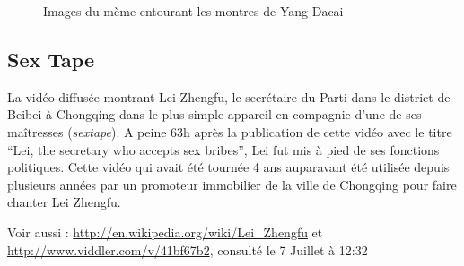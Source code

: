 \begin{figure}[h!]
    \caption{
      Images du mème entourant les montres de Yang Dacai
    }
\end{figure}

\clearpage
\subsection{Sex Tape}

La vidéo diffusée montrant Lei Zhengfu, le secrétaire du Parti dans le district de Beibei à Chongqing dans le plus simple appareil en compagnie d'une de ses maîtresses (\textit{sextape}). A peine 63h après la publication de cette vidéo avec le titre ``Lei, the secretary who accepts sex bribes'', Lei fut mis à pied de ses fonctions politiques. Cette vidéo qui avait été tournée 4 ans auparavant été utilisée depuis plusieurs années par un promoteur immobilier de la ville de Chongqing pour faire chanter Lei Zhengfu. 

Voir aussi :
\url{http://en.wikipedia.org/wiki/Lei_Zhengfu}
et 
\url{http://www.viddler.com/v/41bf67b2}, consulté le 7 Juillet à 12:32


